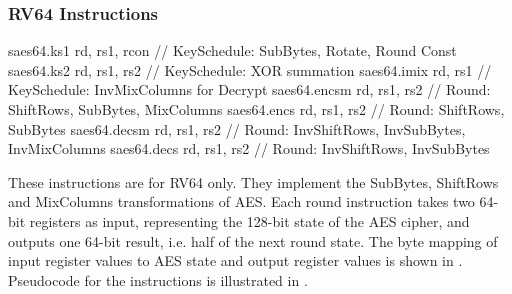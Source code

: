 


\newpage
\subsubsection{RV64 Instructions}
\label{sec:scalar:aes:rv64}

\begin{cryptoisa}
saes64.ks1   rd, rs1, rcon // KeySchedule: SubBytes, Rotate, Round Const
saes64.ks2   rd, rs1, rs2  // KeySchedule: XOR summation
saes64.imix  rd, rs1       // KeySchedule: InvMixColumns for Decrypt
saes64.encsm rd, rs1, rs2  // Round:    ShiftRows,    SubBytes,    MixColumns
saes64.encs  rd, rs1, rs2  // Round:    ShiftRows,    SubBytes
saes64.decsm rd, rs1, rs2  // Round: InvShiftRows, InvSubBytes, InvMixColumns
saes64.decs  rd, rs1, rs2  // Round: InvShiftRows, InvSubBytes
\end{cryptoisa}

These instructions are for RV64 only.
They implement the SubBytes, ShiftRows and MixColumns transformations of AES.
Each round instruction takes two 64-bit registers as input, representing
the 128-bit state of the AES cipher, and outputs one 64-bit
result, i.e. half of the next round state.
The byte mapping of input register values to AES state and output register
values is shown in .
Pseudocode for the instructions is illustrated in
.

